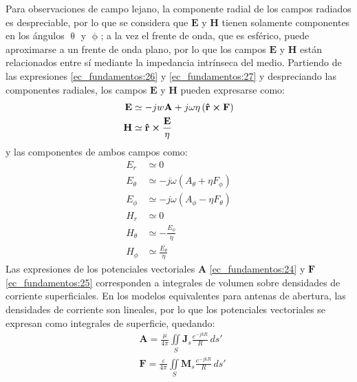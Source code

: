 Para observaciones de campo lejano, la componente radial de los campos radiados es despreciable, por lo que se considera que $\mathbf{E}$ y $\mathbf{H}$ tienen solamente componentes en los ángulos $\uptheta$ y $\upphi$; a la vez el frente de onda, que es esférico, puede aproximarse a un frente de onda plano, por lo que los campos $\mathbf{E}$ y $\mathbf{H}$ están relacionados entre sí mediante la impedancia intrínseca del medio. Partiendo de las expresiones \eqref{ec_fundamentos:26} y \eqref{ec_fundamentos:27} y despreciando las componentes radiales, los campos $\mathbf{E}$ y $\mathbf{H}$ pueden expresarse como:
\begin{align}
\mathbf{E} &\simeq - jw\mathbf{A} + j\omega\eta\left(\bm{\mathbf{\hat{r}}}\boldsymbol{\times}\mathbf{F}\right)
\label{ec_fundamentos:33}\\
\mathbf{H} &\simeq \bm{\mathbf{\hat{r}}}\boldsymbol{\times}\frac{\mathbf{E}}{\eta}
\label{ec_fundamentos:34}
\end{align}
y las componentes de ambos campos como:
\begin{subequations}
\label{grup_ec_fundamentos:1}
\begin{align}
E_r &\simeq 0
\label{ec_fundamentos:35}\\
E_{\theta} &\simeq - j\omega\left(A_{\theta} + \eta F_{\phi}\right)
\label{ec_fundamentos:36}\\
E_{\phi} &\simeq - j\omega\left(A_{\phi} - \eta F_{\theta}\right)
\label{ec_fundamentos:37}\\
H_r &\simeq 0
\label{ec_fundamentos:38}\\
H_{\theta} &\simeq - \frac{E_{\phi}}{\eta}
\label{ec_fundamentos:39}\\
H_{\phi} &\simeq \frac{E_{\theta}}{\eta}
\label{ec_fundamentos:40}
\end{align}
\end{subequations}
Las expresiones de los potenciales vectoriales $\mathbf{A}$ \eqref{ec_fundamentos:24} y $\mathbf{F}$ \eqref{ec_fundamentos:25} corresponden a integrales de volumen sobre densidades de corriente superficiales. En los modelos equivalentes para antenas de abertura, las densidades de corriente son lineales, por lo que los potenciales vectoriales se expresan como integrales de superficie, quedando:
\begin{align}
&\mathbf{A} = \frac{\mu}{4\pi}\iint\limits_S\mathbf{J}_s\frac{e^{-jkR}}{R}\,ds'
\label{ec_fundamentos:41}\\
&\mathbf{F} = \frac{\varepsilon}{4\pi}\iint\limits_S\mathbf{M}_s\frac{e^{-jkR}}{R}\,ds'
\label{ec_fundamentos:42}
\end{align}

